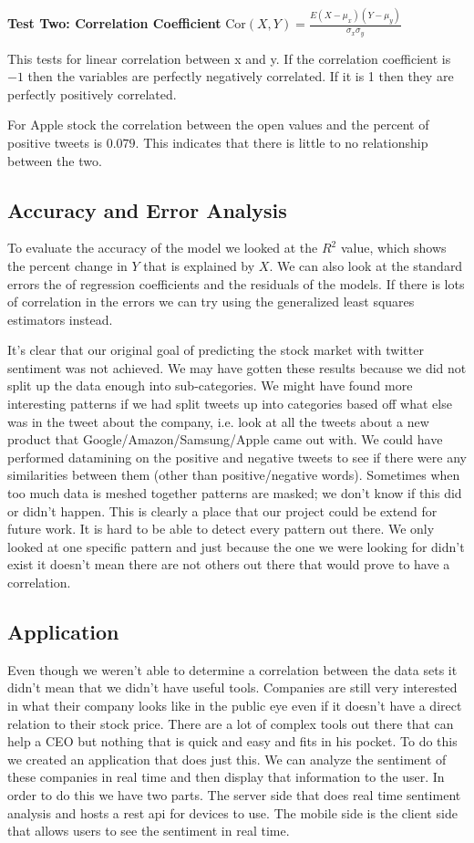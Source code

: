 \documentclass{acm_proc_article-sp}
\begin{document}
\textbf{Test Two: Correlation Coefficient}
Cor$(X,Y) = \frac{E ( X - \mu_x)(Y - \mu_y)}{\sigma_x\sigma_y}$


This tests for linear correlation between x and y. If the correlation
coefficient is $-1$ then the variables are perfectly negatively correlated. If
it is 1 then they are perfectly positively correlated.  

For Apple stock the correlation between the open values and the percent of positive
tweets is $0.079 $. This indicates that there is little to no relationship
between the two. 

\subsection{Accuracy and Error Analysis}
To evaluate the accuracy of the model we looked at the $R^2$ value, which shows
the percent change in $Y$ that is explained by $X$. We can also look at the
standard errors the of regression coefficients and the residuals of the models.
If there is lots of correlation in the errors we can try using the generalized
least squares estimators instead. 

It's clear that our original goal of predicting the stock market with twitter sentiment 
was not achieved. We may have gotten these results because we did not split up the data 
enough into sub-categories. We might have found more interesting patterns if we had split tweets
up into categories based off what else was in the tweet about the company, i.e. look at all the
tweets about a new product that Google/Amazon/Samsung/Apple came out with. We could have performed datamining
on the positive and negative tweets to see if there were any similarities between them (other 
than positive/negative words). Sometimes when too much data is meshed together patterns are masked;
we don't know if this did or didn't happen. This is clearly a place that our project could be extend for future work.
It is hard to be able to detect every pattern out there. We only looked at one specific pattern and just because
the one we were looking for didn't exist it doesn't mean there are not others out there that would prove to have a correlation.  

\subsection{Application}

Even though we weren't able to determine a correlation between the data sets it
didn't mean that we didn't have useful tools. Companies are still very
interested in what their company looks like in the public eye even if it
doesn't have a direct relation to their stock price. There are a lot of complex
tools out there that can help a CEO but nothing that is quick and easy and fits
in his pocket. To do this we created an application that does just this. We can
analyze the sentiment of these companies in real time and then display that
information to the user. In order to do this we have two parts. The server side
that does real time sentiment analysis and hosts a rest api for devices to use.
The mobile side is the client side that allows users to see the sentiment in
real time.
\end{document}
